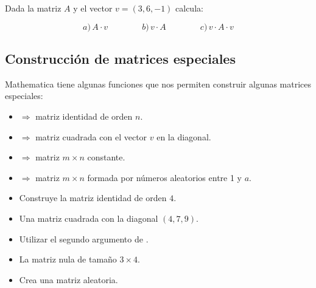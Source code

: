 \documentclass[a4paper,10pt, draft]{article}
\newcommand{\com}[1]{\textbf{\color{blue}{#1}}}
\newenvironment{ejer}{\begin{tcolorbox}[center title, title=Ejercicios,
fonttitle=\sffamily\bfseries,colback=blue!5,colframe=orange]}{\end{tcolorbox}}
\begin{document}
\begin{ejer}

Dada la matriz $A$ y el vector $v=(3,6,-1)$ calcula:

$$
a)\,A\cdot v \qquad \qquad b)\,v \cdot A \qquad \qquad c)\,v \cdot A \cdot v
$$

\end{ejer}  \newpage

\subsection{Construcción de matrices especiales}

Mathematica tiene algunas funciones que nos permiten construir algunas matrices especiales:

\begin{itemize}


\item   \com{IdentityMatrix[n]} $\Rightarrow$   matriz identidad de orden $n$.


 \item \com{DiagonalMatrix[v]}  $\Rightarrow$   matriz cuadrada con el vector $v$  en la diagonal.
 
 
 \item  \com{ConstantArray[a,\{m,n\}]} $\Rightarrow$   matriz $m\times n$ constante.
 
 \item \com{RandomInteger[a,\{m,n\}]} $\Rightarrow$   matriz $m\times n$ formada por nú\-meros aleatorios entre 1 y $a$.
  
  
  \end{itemize}






\begin{ejer}

\begin{itemize}

\item Construye la matriz identidad de orden $4$.

\item Una matriz cuadrada con la diagonal $(4,7,9)$.

\item Utilizar el segundo argumento de \com{DiagonalMatrix}.

\item La matriz nula de tamaño $3\times 4$.

\item Crea una matriz aleatoria.


\end{itemize}

\end{ejer} 
\end{document}
